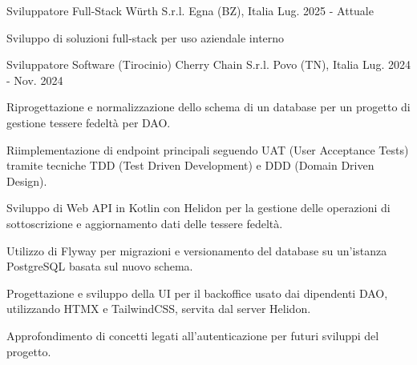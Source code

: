

\begin{cventries}

  \cventry
    {Sviluppatore Full-Stack} %
    {Würth S.r.l.} %
    {Egna (BZ), Italia} %
    {Lug. 2025 - Attuale} %
    {
      \begin{cvitems} %
        \item {Sviluppo di soluzioni full-stack per uso aziendale interno}
      \end{cvitems}
    }
    
  \cventry
    {Sviluppatore Software} %
    {(Tirocinio) Cherry Chain S.r.l.} %
    {Povo (TN), Italia} %
    {Lug. 2024 - Nov. 2024} %
    {
      \begin{cvitems} %
        \item {Riprogettazione e normalizzazione dello schema di un database per un progetto di gestione tessere fedeltà per DAO.}
        \item {Riimplementazione di endpoint principali seguendo UAT (User Acceptance Tests) tramite tecniche TDD (Test Driven Development) e DDD (Domain Driven Design).}
        \item {Sviluppo di Web API in Kotlin con Helidon per la gestione delle operazioni di sottoscrizione e aggiornamento dati delle tessere fedeltà.}
        \item {Utilizzo di Flyway per migrazioni e versionamento del database su un'istanza PostgreSQL basata sul nuovo schema.}
        \item {Progettazione e sviluppo della UI per il backoffice usato dai dipendenti DAO, utilizzando HTMX e TailwindCSS, servita dal server Helidon.}
        \item {Approfondimento di concetti legati all'autenticazione per futuri sviluppi del progetto.}
      \end{cvitems}
    }



\end{cventries}
